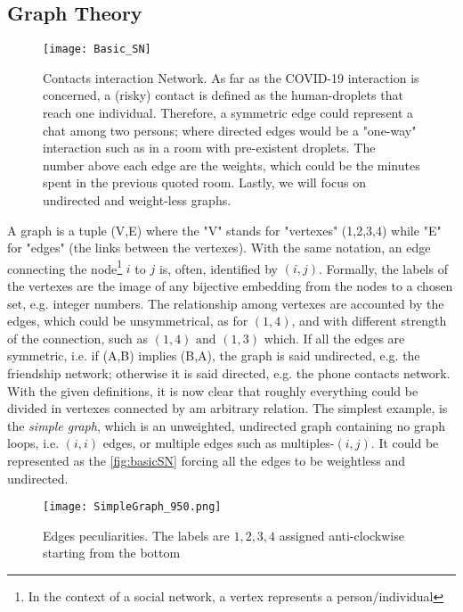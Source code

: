 \documentclass[a4paper,10pt,twoside]{book} %
\theoremstyle{definition}
\begin{document}
\subsection{Graph Theory}
\label{sec:GraphTheory}
\begin{figure}[htbp]
	\centering
	\texttt{[image: Basic\_SN]}
	\caption{Contacts interaction Network. As far as the COVID-19 interaction is concerned, a (risky) contact is defined as the human-droplets that reach one individual. Therefore, a symmetric edge could represent a chat among two persons; where directed edges would be a "one-way" interaction such as in a room with pre-existent droplets. The number above each edge are the weights, which could be the minutes spent in the previous quoted room. Lastly, we will focus on undirected and weight-less graphs.}
	\label{fig:basicSN}
\end{figure}

A graph is a tuple (V,E) where the "V" stands for "vertexes" (1,2,3,4) while "E" for "edges" (the links between the vertexes).
With the same notation, an edge connecting the node\footnote{In the context of a social network, a vertex represents a person/individual} $i$ to $j$ is, often, identified by $(i,j)$.
Formally, the labels of the vertexes are the image of any bijective embedding from the nodes to a chosen set, e.g. integer numbers. The relationship among vertexes are accounted by the edges, which could be unsymmetrical, as for $(1,4)$, and with different strength of the connection, such as $(1,4) \text{ and } (1,3)$ which. If all the edges are symmetric, i.e. if (A,B) implies (B,A), the graph is said undirected, e.g. the friendship network; otherwise it is said directed, e.g. the phone contacts network. 
With the given definitions, it is now clear that roughly everything could be divided in vertexes connected by am arbitrary relation.
The simplest example, is the \textit{simple graph}, which is an unweighted, undirected graph containing no graph loops, i.e. $(i,i)$ edges, or multiple edges such as multiples-$(i,j)$. It could be represented as the \autoref{fig:basicSN} forcing all the edges to be weightless and undirected.
\begin{figure}[ht]
	\texttt{[image: SimpleGraph\_950.png]}
	\caption{Edges peculiarities. The labels are $1,2,3,4$ assigned anti-clockwise starting from the bottom}
	\label{fig:simple}
\end{figure}
\newpage
\end{document}
